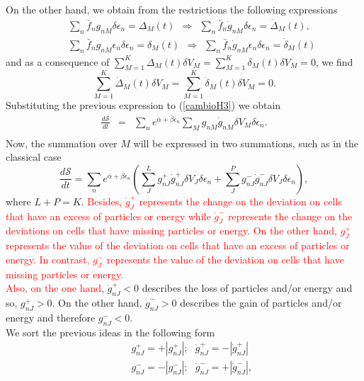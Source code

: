 \documentclass{article}
\newcommand{\de}{\delta}
\newcommand{\Ss}{\mathcal{S}}
\begin{document}
On the other hand, we obtain from the restrictions the following expressions
\begin{eqnarray}
    &&\sum_n \bar{f}_n g_{nM} \delta \epsilon_n=\Delta_M(t) \ \  \Rightarrow \ \  \sum_n \bar{f}_n \dot{g}_{nM} \delta \epsilon_n=\dot{\Delta}_M(t), \nonumber \\
    &&\sum_n  \bar{f}_n g_{nM}\epsilon_n \delta \epsilon_n=\delta_M(t) \ \  \Rightarrow \ \  \sum_n \bar{f}_n \dot{g}_{nM}\epsilon_n \delta \epsilon_n=\dot{\delta}_M(t)
\end{eqnarray}{}
and as a consequence of $\sum_{M=1}^{K} \Delta_M(t) \de V_M  =\sum_{M=1}^{K} \delta_M(t) \de V_M =0$, we find
\begin{equation}
    \sum_{M=1}^{K} \dot{\Delta}_M(t) \de V_M =\sum_{M=1}^{K} \dot{\delta}_{M}(t) \de V_M=0.
\end{equation}{}
Substituting the previous expression to (\ref{cambioH3}) we obtain
\begin{eqnarray}
   \frac{d\Ss}{dt}&=&  \sum_n e^{\bar{\alpha}+\bar{\beta}\epsilon_n}\sum_M  g_{nM}\dot{g}_{nM} \de V_M\delta \epsilon_n. \nonumber \\ \label{cambioH4}
\end{eqnarray}{}
Now, the summation over $M$ will be expressed in two summations, such as in the classical case
\begin{equation}
    \frac{d\Ss}{dt}=\sum_n  e^{\bar{\alpha}+\bar{\beta}\epsilon_n}\left(\sum_J ^{L} g^{+}_{nJ}\dot{g}^{+}_{nJ}\de V_J \delta \epsilon_n+\sum^{P}_J  g^{-}_{nJ}\dot{g}^{-}_{nJ} \de V_J\delta \epsilon_n \right), \label{cambioH5}
\end{equation}
where $L+P=K$. \textcolor{red}{Besides, $\dot{g}^{+}_{J}$ represents the change on the deviation on cells that have an excess of particles or energy while $\dot{g}^{-}_{J}$  represents the change on the deviations on cells that have missing particles or energy. 
On the other hand, $g^{+}_{J}$  represents the value of the deviation on cells that have an excess of particles or energy. In contrast, $g^{-}_{J}$ represents the value of the deviation on cells that have missing particles or energy.\\
Also, on the one hand}, $\dot{g}^{+}_{nJ}<0$ describes the loss of particles and/or energy and so, $g^{+}_{nJ}>0$. On the other hand, $\dot{g}^{-}_{nJ}>0$ describes the gain of particles and/or energy and therefore $g^{-}_{nJ}<0$. \\
We sort the previous ideas in the following form
\begin{eqnarray}
   &&g^{+}_{nJ}=+|g^{+}_{nJ}|; \ \ \  \dot{g}^{+}_{nJ}=-|\dot{g}^{+}_{nJ}| \nonumber \\
   &&g^{-}_{nJ}=-|g^{-}_{nJ}|; \ \ \ \dot{g}^{-}_{nJ}=+|\dot{g}^{-}_{nJ}| \label{separacion},
\end{eqnarray}{}
\end{document}
